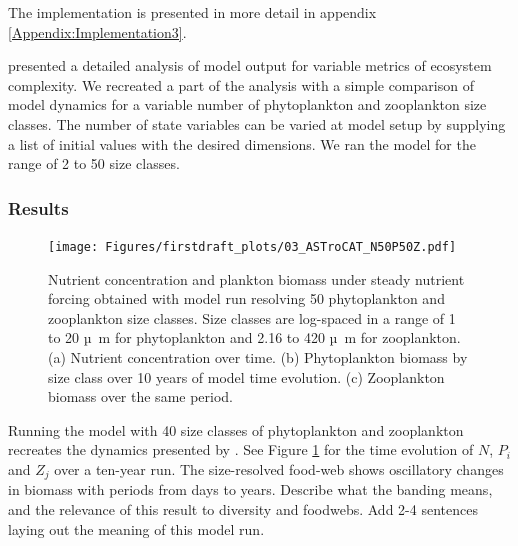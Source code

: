 \documentclass[journal abbreviation, manuscript]{copernicus}
\begin{document}
The implementation is presented in more detail in appendix \ref{Appendix:Implementation3}.

\citet{Banas2011b} presented a detailed analysis of model output for variable metrics of ecosystem complexity. We recreated a part of the analysis with a simple comparison of model dynamics for a variable number of phytoplankton and zooplankton size classes. The number of state variables can be varied at model setup by supplying a list of initial values with the desired dimensions. We ran the model for the range of 2 to 50 size classes.

\subsubsection{Results}
\begin{figure}[t]
\texttt{[image: Figures/firstdraft\_plots/03\_ASTroCAT\_N50P50Z.pdf]}
\caption{Nutrient concentration and plankton biomass under steady nutrient forcing obtained with model run resolving 50 phytoplankton and zooplankton size classes. Size classes are log-spaced in a range of 1 to 20 \unit{µ m} for phytoplankton and 2.16 to 420 \unit{µ m} for zooplankton. (a) Nutrient concentration over time. (b) Phytoplankton biomass by size class over 10 years of model time evolution. (c) Zooplankton biomass over the same period.}
\label{Figure:ResultsASTroCAT_1}
\end{figure}

Running the model with 40 size classes of phytoplankton and zooplankton recreates the dynamics presented by \citet{Banas2011b}. See Figure \ref{Figure:ResultsASTroCAT_1} for the time evolution of $N$, $P_i$ and $Z_j$ over a ten-year run. The size-resolved food-web shows oscillatory changes in biomass with periods from days to years. Describe what the banding means, and the relevance of this result to diversity and foodwebs. Add 2-4 sentences laying out the meaning of this model run.
\end{document}
